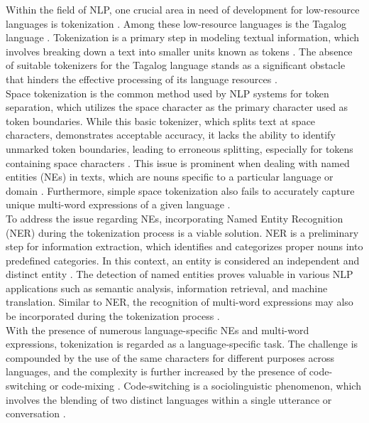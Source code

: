 \documentclass[journal]{./IEEE/IEEEtran}
\begin{document}
Within the field of NLP, one crucial area in need of development for low-resource languages is tokenization {\cite{Cutter}}. Among these low-resource languages is the Tagalog language  {\cite{TweetTaglish}}. Tokenization is a primary step in modeling textual information, which involves breaking down a text into smaller units known as tokens {\cite{Cutter}}. The absence of suitable tokenizers for the Tagalog language stands as a significant obstacle that hinders the effective processing of its language resources {\cite{TweetTaglish}}. \\

Space tokenization is the common method used by NLP systems for token separation, which utilizes the space character as the primary character used as token boundaries. While this basic tokenizer, which splits text at space characters, demonstrates acceptable accuracy, it lacks the ability to identify unmarked token boundaries, leading to erroneous splitting, especially for tokens containing space characters {\cite{Cutter}}. This issue is prominent when dealing with named entities (NEs) in texts, which are nouns specific to a particular language or domain {\cite{ChemTok}}. Furthermore, simple space tokenization also fails to accurately capture unique multi-word expressions of a given language {\cite{Sudachi}}. \\

To address the issue regarding NEs, incorporating Named Entity Recognition (NER) during the tokenization process is a viable solution. NER is a preliminary step for information extraction, which identifies and categorizes proper nouns into predefined categories. In this context, an entity is considered an independent and distinct entity {\cite{ChemTok}}. The detection of named entities proves valuable in various NLP applications such as semantic analysis, information retrieval, and machine translation. Similar to NER, the recognition of multi-word expressions may also be incorporated during the tokenization process {\cite{Sudachi}}. \\

With the presence of numerous language-specific NEs and multi-word expressions, tokenization is regarded as a language-specific task. The challenge is compounded by the use of the same characters for different purposes across languages, and the complexity is further increased by the presence of code-switching or code-mixing {\cite{Cutter}}.  Code-switching is a sociolinguistic phenomenon, which involves the blending of two distinct languages within a single utterance or conversation {\cite{TweetTaglish}}. \\
\end{document}
